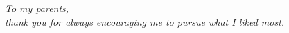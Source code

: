 
\thispagestyle{empty}
{}

\hfill
\vfill

\begin{flushright}
\itshape
To my parents,\\ thank you for always encouraging me to pursue what I liked most.  
\end{flushright}

\vfill

\cleardoublepage
\endinput

